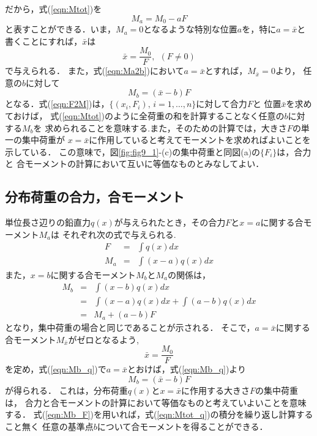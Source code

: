 \documentclass[10pt,a4j]{jbook}
\begin{document}
だから，式(\ref{eqn:Mtot})を
\begin{equation}
	M_a = M_0 -aF 
	\label{eqn:}
\end{equation}
と表すことができる．いま，$M_a=0$となるような特別な位置$a$を，特に$a=\bar x$と
書くことにすれば，$\bar x$は
\begin{equation}
	\bar{x} = \frac{M_0}{F}, \ \ (F\neq 0)
	\label{eqn:xbar}
\end{equation}
で与えられる． また，式(\ref{eqn:Ma2b})において$a=\bar x$とすれば，$M_{\bar x}=0$より，
任意の$b$に対して
\begin{equation}
	M_b= \left( \bar x - b\right) F
	\label{eqn:F2M}
\end{equation}
となる．式(\ref{eqn:F2M})は，$\{ (x_i, F_i),\, i=1,\dots ,n\}$に対して合力$F$と
位置$\bar x$を求めておけば， 
式(\ref{eqn:Mtot})のように全荷重の和を計算することなく任意の$b$に対する$M_b$を
求められることを意味する.また，そのための計算では，大きさ$F$の単一の集中荷重が
$x=\bar x$に作用していると考えてモーメントを求めればよいことを示している．
この意味で，図\ref{fig:fig9_1}-(c)の集中荷重と同図(a)の$\{ F_i\}$は，合力と
合モーメントの計算において互いに等価なものとみなしてよい．
\subsection{分布荷重の合力，合モーメント}
単位長さ辺りの鉛直力$q(x)$が与えられたとき，その合力$F$と$x=a$に関する合モーメント$M_a$は
それぞれ次の式で与えられる.
\begin{eqnarray}
	F &= & \int q(x) dx 
	\label{eqn:Ftot_q}
	\\
	M_a &= & \int (x-a)q(x) dx 
	\label{eqn:Mtot_q}
\end{eqnarray}
また，$x=b$に関する合モーメント$M_b$と$M_a$の関係は，
\begin{eqnarray}
	M_b 
	&=& \int (x-b)q(x)dx \nonumber \\
	&=& \int (x-a)q(x) dx + \int (a-b)q(x)dx \nonumber \\
	&=& M_a+(a-b) F
	\label{eqn:Mb_q}
\end{eqnarray}
となり，集中荷重の場合と同じであることが示される．
そこで，$a=\bar x$に関する合モーメント$M_{\bar x}$がゼロとなるよう,
\begin{equation}
	\bar x = \frac{M_0}{F}
\end{equation}
を定め，式(\ref{eqn:Mb_q})で$a=\bar x$とおけば，式(\ref{eqn:Mb_q})より
\begin{equation}
	M_b=\left(\bar x - b\right)F
	\label{eqn:Mb_F}
\end{equation}
が得られる．
これは，分布荷重$q(x)$と$x=\bar x$に作用する大きさ$F$の集中荷重は，
合力と合モーメントの計算において等価なものと考えていよいことを意味する．
式(\ref{eqn:Mb_F})を用いれば，式(\ref{eqn:Mtot_q})の積分を繰り返し計算すること無く
任意の基準点$b$について合モーメントを得ることができる．
\end{document}
